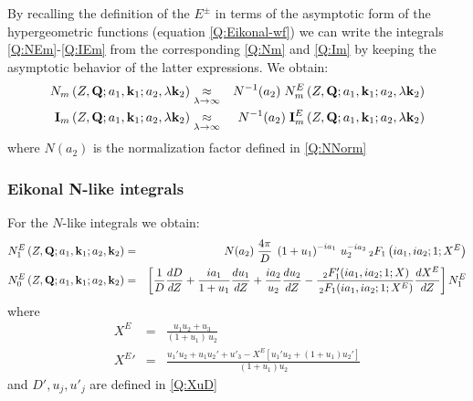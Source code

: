 By recalling the definition of the $E^{\pm}$ in terms of the asymptotic
form of the hypergeometric functions (equation \ref{Q:Eikonal-wf}) we
can write the integrals \ref{Q:NEm}-\ref{Q:IEm} from the corresponding
\ref{Q:Nm} and \ref{Q:Im} by keeping the asymptotic behavior of the
latter expressions. We obtain:
%
\begin{eqnarray*}
N_{m} \left(Z, \mathbf{Q} ; a_{1}, \mathbf{k}_{1} ; a_{2}, \lambda \mathbf{k}_{2}
\right) &\mathrel{\mathop{\kern0pt\approx}\limits_{\lambda \to \infty}}& N^{-1}(a_{2}) \; N^{E}_{m}
\left(Z, \mathbf{Q}; a_{1}, \mathbf{k}_{1} ; a_{2}, \lambda \mathbf{k}_{2} \right)
\\
\mathbf{I}_{m} \left(Z, \mathbf{Q} ; a_{1}, \mathbf{k}_{1} ; a_{2}, \lambda
\mathbf{k}_{2} \right) &\mathrel{\mathop{\kern0pt\approx}\limits_{\lambda \to \infty}}& N^{-1}(a_{2})
\; \mathbf{I}^{E}_{m} \left(Z, \mathbf{Q} ; a_{1}, \mathbf{k}_{1} ; a_{2}, \lambda
\mathbf{k}_{2} \right)
\end{eqnarray*}
where $N(a_{2})$ is the normalization factor defined in \ref{Q:NNorm}

\subsubsection{Eikonal N-like integrals}

For the $N$-like integrals we obtain:
%
\begin{eqnarray}\label{Q:N-integ}
N^{E}_{1} \left(Z, \mathbf{Q} ; a_{1}, \mathbf{k}_{1} ; a_{2}, \mathbf{k}_{2}
\right) &=& N(a_{2})\;\frac{4 \pi}{D} \; \left( 1 + u_{1}
\right)^{-i a_{1}} \, u_{2}^{-i a_{2}} \, {_{2}F_{1}}\left( i
a_{1} , i a_{2} ; 1 ; X^{E} \right)
\\
N^{E}_{0} \left(Z, \mathbf{Q} ; a_{1}, \mathbf{k}_{1} ; a_{2}, \mathbf{k}_{2}
\right) &=& \left[ \frac{1}{D} \frac{d D}{d Z} + \frac{i
a_{1}}{1 + u_{1}} \frac{d u_{1}}{d Z} + \frac{i a_{2}}{u_{2}}
\frac{d u_{2}}{d Z} - \frac{\,{_{2}F'_{1}}(i a_{1}, i a_{2};
1; X)}{\,{_{2}F_{1}}(i a_{1}, i a_{2}; 1; X^{E})} \frac{d
X^{E}}{d Z} \right] N^{E}_{1} \nonumber
\\
\end{eqnarray}
%
where
\begin{eqnarray*}
X^{E} &=& \frac{u_{1} u_{2} + u_{3}}{(1+u_{1}) \, u_{2}}  \nonumber \\
{X^{E}}' &=& \frac{ u_{1}' u_{2} + u_{1} u_{2}' + u'_{3} - X^{E} \left[
u_{1}' u_{2} + (1+u_{1}) u_{2}' \right]}{(1 + u_{1})u_{2}}
\end{eqnarray*}
%
and $D',u_{j},u'_{j}$ are defined in \ref{Q:XuD}


